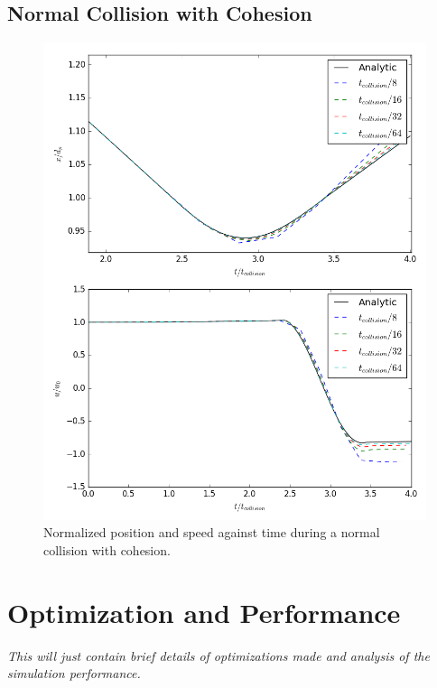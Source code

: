 \documentclass[10pt,a4paper,titlepage]{report}
\begin{document}
\subsection{Normal Collision with Cohesion}
\begin{figure}[!htb]
\centering
\includegraphics[scale=0.5]{figures/opencl_verification/cohesion_verification.png}
\caption{Normalized position and speed against time during a normal collision with cohesion.}
\label{fig:opencl_cohesion_verification}
\end{figure}
\section{Optimization and Performance}
\textit{This will just contain brief details of optimizations made and analysis of the simulation performance.}
\end{document}
